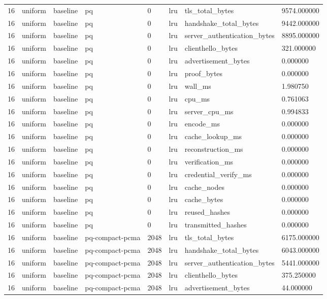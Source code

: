 \begin{tabular}{llllllll}
16 & uniform & baseline & pq & 0 & lru & tls\_total\_bytes & 9574.000000 \\
16 & uniform & baseline & pq & 0 & lru & handshake\_total\_bytes & 9442.000000 \\
16 & uniform & baseline & pq & 0 & lru & server\_authentication\_bytes & 8895.000000 \\
16 & uniform & baseline & pq & 0 & lru & clienthello\_bytes & 321.000000 \\
16 & uniform & baseline & pq & 0 & lru & advertisement\_bytes & 0.000000 \\
16 & uniform & baseline & pq & 0 & lru & proof\_bytes & 0.000000 \\
16 & uniform & baseline & pq & 0 & lru & wall\_ms & 1.980750 \\
16 & uniform & baseline & pq & 0 & lru & cpu\_ms & 0.761063 \\
16 & uniform & baseline & pq & 0 & lru & server\_cpu\_ms & 0.994833 \\
16 & uniform & baseline & pq & 0 & lru & encode\_ms & 0.000000 \\
16 & uniform & baseline & pq & 0 & lru & cache\_lookup\_ms & 0.000000 \\
16 & uniform & baseline & pq & 0 & lru & reconstruction\_ms & 0.000000 \\
16 & uniform & baseline & pq & 0 & lru & verification\_ms & 0.000000 \\
16 & uniform & baseline & pq & 0 & lru & credential\_verify\_ms & 0.000000 \\
16 & uniform & baseline & pq & 0 & lru & cache\_nodes & 0.000000 \\
16 & uniform & baseline & pq & 0 & lru & cache\_bytes & 0.000000 \\
16 & uniform & baseline & pq & 0 & lru & reused\_hashes & 0.000000 \\
16 & uniform & baseline & pq & 0 & lru & transmitted\_hashes & 0.000000 \\
16 & uniform & baseline & pq-compact-pcma & 2048 & lru & tls\_total\_bytes & 6175.000000 \\
16 & uniform & baseline & pq-compact-pcma & 2048 & lru & handshake\_total\_bytes & 6043.000000 \\
16 & uniform & baseline & pq-compact-pcma & 2048 & lru & server\_authentication\_bytes & 5441.000000 \\
16 & uniform & baseline & pq-compact-pcma & 2048 & lru & clienthello\_bytes & 375.250000 \\
16 & uniform & baseline & pq-compact-pcma & 2048 & lru & advertisement\_bytes & 44.000000 \\

\end{tabular}
